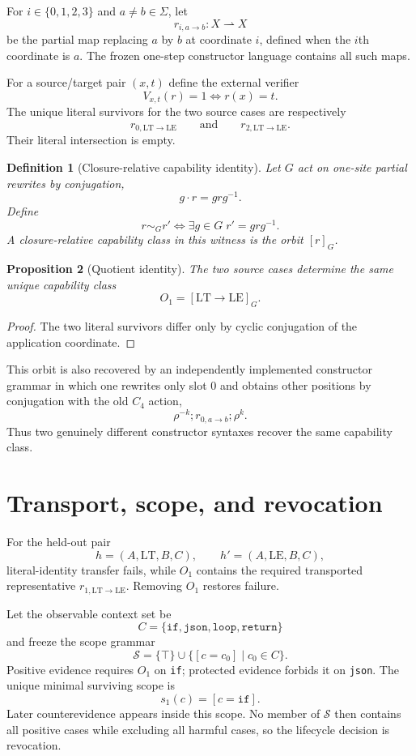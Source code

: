 \documentclass[11pt]{article}
\newtheorem{definition}{Definition}[section]
\newtheorem{proposition}[definition]{Proposition}
\begin{document}
For $i\in\{0,1,2,3\}$ and $a\neq b\in\Sigma$, let
\[
r_{i,a\to b}:X\rightharpoonup X
\]
be the partial map replacing $a$ by $b$ at coordinate $i$, defined when the $i$th coordinate is $a$.
The frozen one-step constructor language contains all such maps.

For a source/target pair $(x,t)$ define the external verifier
\[
V_{x,t}(r)=1\iff r(x)=t.
\]
The unique literal survivors for the two source cases are respectively
\[
r_{0,\mathrm{LT}\to\mathrm{LE}}
\qquad\text{and}\qquad
r_{2,\mathrm{LT}\to\mathrm{LE}}.
\]
Their literal intersection is empty.

\begin{definition}[Closure-relative capability identity]
Let $G$ act on one-site partial rewrites by conjugation,
\[
g\cdot r = g r g^{-1}.
\]
Define
\[
r\sim_G r'
\iff
\exists g\in G\; r'=g r g^{-1}.
\]
A closure-relative capability class in this witness is the orbit $[r]_G$.
\end{definition}

\begin{proposition}[Quotient identity]
The two source cases determine the same unique capability class
\[
O_1=[\mathrm{LT}\to\mathrm{LE}]_G.
\]
\end{proposition}

\begin{proof}
The two literal survivors differ only by cyclic conjugation of the application coordinate.
\end{proof}

This orbit is also recovered by an independently implemented constructor grammar in which
one rewrites only slot $0$ and obtains other positions by conjugation with the old $C_4$ action,
\[
\rho^{-k};r_{0,a\to b};\rho^k.
\]
Thus two genuinely different constructor syntaxes recover the same capability class.

\section{Transport, scope, and revocation}

For the held-out pair
\[
h=(A,\mathrm{LT},B,C),\qquad h'=(A,\mathrm{LE},B,C),
\]
literal-identity transfer fails, while $O_1$ contains the required transported representative
$r_{1,\mathrm{LT}\to\mathrm{LE}}$. Removing $O_1$ restores failure.

Let the observable context set be
\[
C=\{\mathtt{if},\mathtt{json},\mathtt{loop},\mathtt{return}\}
\]
and freeze the scope grammar
\[
\mathcal S=\{\top\}\cup\{[c=c_0]\mid c_0\in C\}.
\]
Positive evidence requires $O_1$ on \texttt{if}; protected evidence forbids it on \texttt{json}.
The unique minimal surviving scope is
\[
s_1(c)=[c=\mathtt{if}].
\]
Later counterevidence appears inside this scope. No member of $\mathcal S$ then contains all
positive cases while excluding all harmful cases, so the lifecycle decision is revocation.
\end{document}
